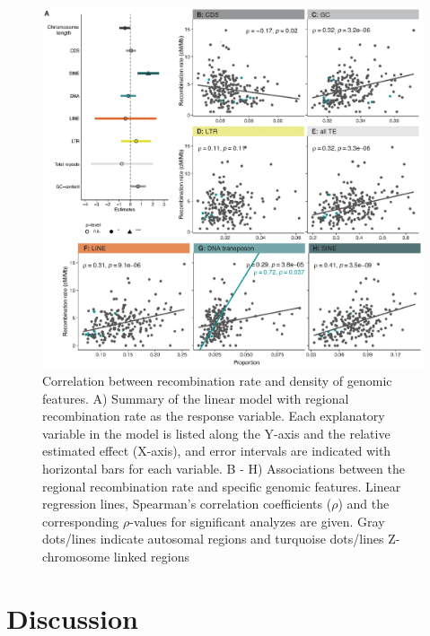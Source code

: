\documentclass[twocolumn]{bmcart}%
\begin{document}
\begin{figure}[tb]
    \centering
\includegraphics[width=1.99\linewidth]{ShipilinaNasvallFig5opt.eps}
    \caption{Correlation between recombination rate and density of genomic features. A) Summary of the linear model with regional recombination rate as the response variable. Each explanatory variable in the model is listed along the Y-axis and the relative estimated effect (X-axis), and error intervals are indicated with horizontal bars for each variable. B - H) Associations between the regional recombination rate and specific genomic features. Linear regression lines, Spearman's correlation coefficients ($\rho$) and the corresponding $\rho$-values for significant analyzes are given. Gray dots/lines indicate autosomal regions and turquoise dots/lines Z-chromosome linked regions
}
    \label{fig:5}
\end{figure}


\section*{Discussion}
\end{document}
